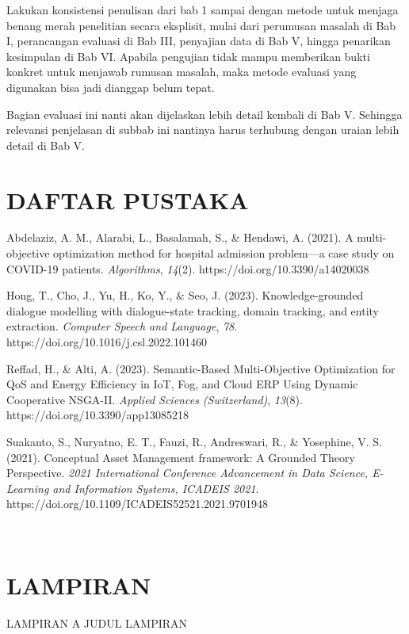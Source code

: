 Lakukan konsistensi penulisan dari bab 1 sampai dengan metode untuk
menjaga benang merah penelitian secara eksplisit, mulai dari perumusan
masalah di Bab I, perancangan evaluasi di Bab III, penyajian data di Bab
V, hingga penarikan kesimpulan di Bab VI. Apabila pengujian tidak mampu
memberikan bukti konkret untuk menjawab rumusan masalah, maka metode
evaluasi yang digunakan bisa jadi dianggap belum tepat.

Bagian evaluasi ini nanti akan dijelaskan lebih detail kembali di Bab V.
Sehingga relevansi penjelasan di subbab ini nantinya harus terhubung
dengan uraian lebih detail di Bab V.

\hypertarget{daftar-pustaka}{%
\section*{DAFTAR PUSTAKA}\label{daftar-pustaka}}

Abdelaziz, A. M., Alarabi, L., Basalamah, S., \& Hendawi, A. (2021). A
multi-objective optimization method for hospital admission problem---a
case study on COVID-19 patients. \emph{Algorithms}, \emph{14}(2).
https://doi.org/10.3390/a14020038

Hong, T., Cho, J., Yu, H., Ko, Y., \& Seo, J. (2023). Knowledge-grounded
dialogue modelling with dialogue-state tracking, domain tracking, and
entity extraction. \emph{Computer Speech and Language}, \emph{78}.
https://doi.org/10.1016/j.csl.2022.101460

Reffad, H., \& Alti, A. (2023). Semantic-Based Multi-Objective
Optimization for QoS and Energy Efficiency in IoT, Fog, and Cloud ERP
Using Dynamic Cooperative NSGA-II. \emph{Applied Sciences
(Switzerland)}, \emph{13}(8). https://doi.org/10.3390/app13085218

Suakanto, S., Nuryatno, E. T., Fauzi, R., Andreswari, R., \& Yosephine,
V. S. (2021). Conceptual Asset Management framework: A Grounded Theory
Perspective. \emph{2021 International Conference Advancement in Data
Science, E-Learning and Information Systems, ICADEIS 2021}.
https://doi.org/10.1109/ICADEIS52521.2021.9701948

~

\hypertarget{lampiran}{%
\section{LAMPIRAN}\label{lampiran}}

\protect\hypertarget{_Toc211427018}{}{}LAMPIRAN A JUDUL LAMPIRAN

